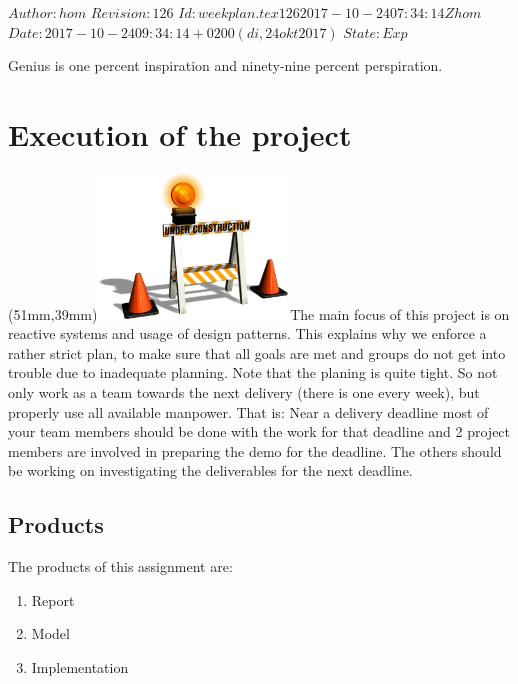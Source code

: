 \renewcommand\TheFile{weekplan.tex}
\SVN $Author: hom $
\SVN $Revision: 126 $
\SVN $Id: weekplan.tex 126 2017-10-24 07:34:14Z hom $
\SVN $Date: 2017-10-24 09:34:14 +0200 (di, 24 okt 2017) $
\SVN $State: Exp $
\begin{savequote}[8cm]
  \sffamily
  Genius is one percent inspiration and ninety-nine percent perspiration.
\end{savequote}
\chapter{Execution of the project}

\parpic(51mm,39mm){\includegraphics[width=51mm]{figures/WorkinProgress.jpg}}The
main focus of this project is on reactive systems and usage of
design patterns. This explains why we enforce a rather strict plan, to
make sure that all goals are met and groups do not get into trouble
due to inadequate planning. Note that the planing is quite tight. So
not only work as a team towards the next delivery (there is one every
week), but properly use all available manpower. That is: Near a
delivery deadline most of your team members should be done with the
work for that deadline and 2 project members are  involved in preparing
the demo for the deadline. The others should be working on
investigating the deliverables for the next deadline.

\section{Products}

The products of this assignment are:
\begin{enumerate}
\item Report
\item Model
\item Implementation
\end{enumerate}

